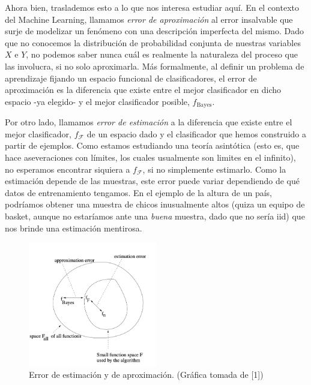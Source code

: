 \documentclass{report}
\begin{document}
Ahora bien, traslademos esto a lo que nos interesa estudiar aquí. En el contexto del Machine Learning, llamamos \textit{error de aproximación}
al error insalvable que surje de modelizar un fenómeno con una descripción imperfecta del mismo. Dado que no conocemos la distribución
de probabilidad conjunta de nuestras variables $X$ e $Y$, no podemos saber nunca cuál es realmente la naturaleza del proceso que las involucra,
si no solo aproximarla. Más formalmente, al definir un problema de aprendizaje fijando un espacio funcional de clasificadores, 
el error de aproximación es la diferencia que existe entre el mejor clasificador en dicho espacio -ya elegido- y el mejor clasificador posible,
$f_{\text{Bayes}}$.

Por otro lado, llamamos \textit{error de estimación} a la diferencia que existe entre el mejor clasificador, $f_{\mathcal{F}}$ de un espacio dado y el clasificador
que hemos construido a partir de ejemplos. Como estamos estudiando una teoría asintótica (esto es, que hace aseveraciones con límites, los cuales usualmente
son limites en el infinito), no esperamos encontrar siquiera a $f_{\mathcal{F}}$, si no simplemente estimarlo. Como la estimación depende de las muestras,
este error puede variar dependiendo de qué datos de entrenamiento tengamos. En el ejemplo de la altura de un país, podríamos obtener una muestra de chicos inusualmente
altos (quiza un equipo de basket, aunque no estaríamos ante una \textit{buena} muestra, dado que no sería iid) que nos brinde una estimación mentirosa. \newline

\begin{figure}[ht!]
    \centering
    \includegraphics[width=0.5\textwidth]{Images/2.png}
    \caption{Error de estimación y de aproximación. (Gráfica tomada de [1])}
    \label{fig:error de estimación y aproximación}
\end{figure}
\end{document}
